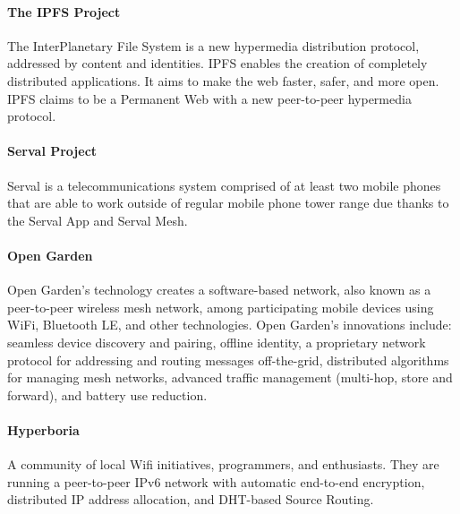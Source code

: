 \paragraph{The IPFS Project\cite{Benet2014IPFS-ContentSystem}}
The InterPlanetary File System is a new hypermedia distribution protocol, addressed by content and identities. IPFS enables the creation of completely distributed applications. It aims to make the web faster, safer, and more open. IPFS claims to be a Permanent Web with a new peer-to-peer hypermedia protocol.

\paragraph{Serval Project\cite{Gardner-stephen2011TheTelecommunications}}
Serval is a telecommunications system comprised of at least two mobile phones that are able to work outside of regular mobile phone tower range due thanks to the Serval App and Serval Mesh.

\paragraph{Open Garden}
Open Garden's technology creates a software-based network, also known as a peer-to-peer wireless mesh network, among participating mobile devices using WiFi, Bluetooth LE, and other technologies. Open Garden's innovations include: seamless device discovery and pairing, offline identity, a proprietary network protocol for addressing and routing messages off-the-grid, distributed algorithms for managing mesh networks, advanced traffic management (multi-hop, store and forward), and battery use reduction.

\paragraph{Hyperboria\cite{HypeHyperboriaWhitepaper}}
A community of local Wifi initiatives, programmers, and enthusiasts. They are running a peer-to-peer IPv6 network with automatic end-to-end encryption, distributed IP address allocation, and DHT-based Source Routing.

